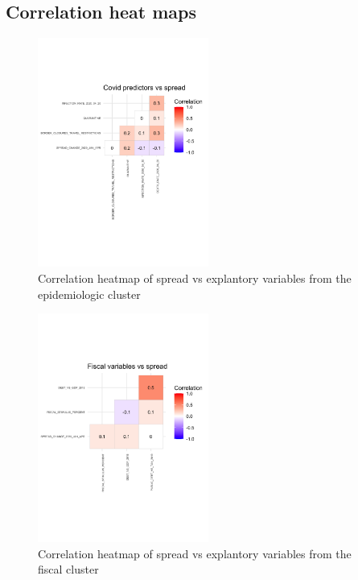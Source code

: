 \documentclass[11pt,]{article}
\begin{document}
\hypertarget{correlation-heat-maps}{%
\subsection{Correlation heat maps}\label{correlation-heat-maps}}

\begin{figure}
\centering
\includegraphics[width=0.5\textwidth,height=\textheight]{reportfigures/Corrplot_spread_vs_covid.png}
\caption{Correlation heatmap of spread vs explantory variables from the
epidemiologic cluster}
\end{figure}

\begin{figure}
\centering
\includegraphics[width=0.5\textwidth,height=\textheight]{reportfigures/Corrplot_spread_vs_fiscal.png}
\caption{Correlation heatmap of spread vs explantory variables from the
fiscal cluster}
\end{figure}
\end{document}
